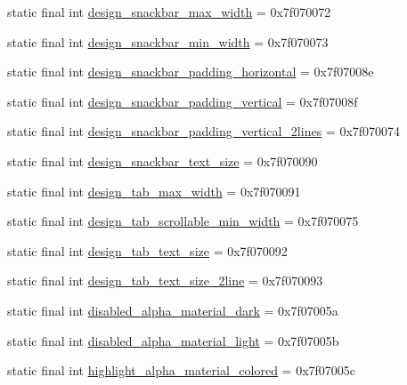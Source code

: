 \begin{CompactItemize}
static final int \hyperlink{classandroid_1_1support_1_1fragment_1_1_r_1_1dimen_f1d49fffcd9e2dc55f32b38ef25fdbcd}{design\_\-snackbar\_\-max\_\-width} = 0x7f070072
\item 
static final int \hyperlink{classandroid_1_1support_1_1fragment_1_1_r_1_1dimen_cad0ecc0ac720be3d249a9c9f3a764e3}{design\_\-snackbar\_\-min\_\-width} = 0x7f070073
\item 
static final int \hyperlink{classandroid_1_1support_1_1fragment_1_1_r_1_1dimen_c7ceccf43022044d4d51dab365d682a0}{design\_\-snackbar\_\-padding\_\-horizontal} = 0x7f07008e
\item 
static final int \hyperlink{classandroid_1_1support_1_1fragment_1_1_r_1_1dimen_95bad3abe774364be37a56d3ff040eb2}{design\_\-snackbar\_\-padding\_\-vertical} = 0x7f07008f
\item 
static final int \hyperlink{classandroid_1_1support_1_1fragment_1_1_r_1_1dimen_c31765f324d832073b176f21dfff10f4}{design\_\-snackbar\_\-padding\_\-vertical\_\-2lines} = 0x7f070074
\item 
static final int \hyperlink{classandroid_1_1support_1_1fragment_1_1_r_1_1dimen_b1768f947136d01e0c46b4e8cda2f5c1}{design\_\-snackbar\_\-text\_\-size} = 0x7f070090
\item 
static final int \hyperlink{classandroid_1_1support_1_1fragment_1_1_r_1_1dimen_60be3caf91dfad1ea2ea6de8d96e8aad}{design\_\-tab\_\-max\_\-width} = 0x7f070091
\item 
static final int \hyperlink{classandroid_1_1support_1_1fragment_1_1_r_1_1dimen_29901e2316880588d13bd56b3b288be4}{design\_\-tab\_\-scrollable\_\-min\_\-width} = 0x7f070075
\item 
static final int \hyperlink{classandroid_1_1support_1_1fragment_1_1_r_1_1dimen_51d35fdf2e5c326b3bf2e5e2a65e907a}{design\_\-tab\_\-text\_\-size} = 0x7f070092
\item 
static final int \hyperlink{classandroid_1_1support_1_1fragment_1_1_r_1_1dimen_5cf66bde183c49c533181f41c09d31da}{design\_\-tab\_\-text\_\-size\_\-2line} = 0x7f070093
\item 
static final int \hyperlink{classandroid_1_1support_1_1fragment_1_1_r_1_1dimen_07f82eb71ac63b6f172e9fbc26c6767e}{disabled\_\-alpha\_\-material\_\-dark} = 0x7f07005a
\item 
static final int \hyperlink{classandroid_1_1support_1_1fragment_1_1_r_1_1dimen_bed8d355eec11d0448f56e6ea1d2b77a}{disabled\_\-alpha\_\-material\_\-light} = 0x7f07005b
\item 
static final int \hyperlink{classandroid_1_1support_1_1fragment_1_1_r_1_1dimen_7d577560f639e51294260c5cd642b431}{highlight\_\-alpha\_\-material\_\-colored} = 0x7f07005c

\end{CompactItemize}
